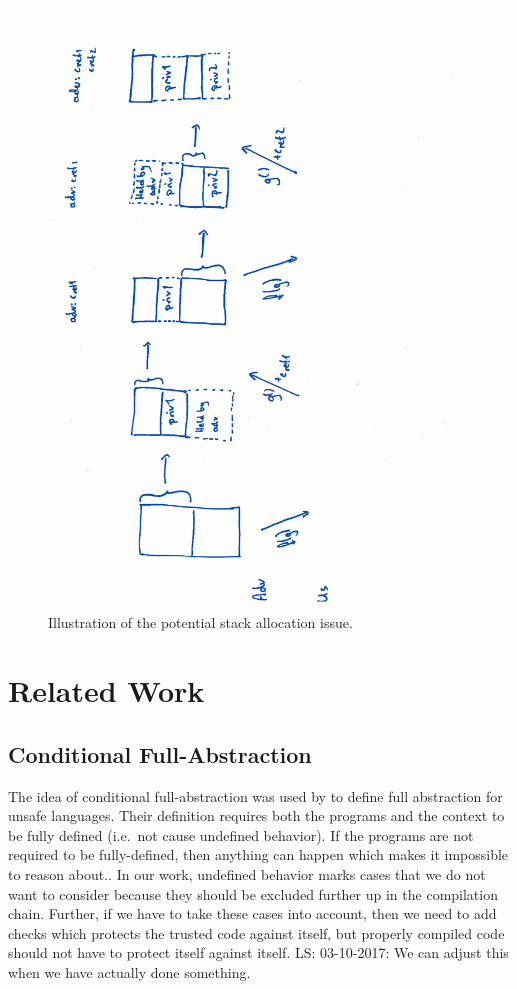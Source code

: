 \documentclass[a3paper]{article}
\newcommand\lau[1]{{\color{purple} \sf \footnotesize {LS: #1}}\\}
\begin{document}
\begin{figure}
  \centering
  \includegraphics[angle=270,trim={0 0 5cm 0},width=\textwidth]{img/stk-alloc.pdf}
  \caption{Illustration of the potential stack allocation issue.}
  \label{fig:stk-alloc}
\end{figure}

\section{Related Work}
\subsection{Conditional Full-Abstraction}
The idea of conditional full-abstraction was used by \citet{Juglaret2016} to define full abstraction for unsafe languages. Their definition requires both the programs and the context to be fully defined (i.e.\ not cause undefined behavior). If the programs are not required to be fully-defined, then anything can happen which makes it impossible to reason about.. In our work, undefined behavior marks cases that we do not want to consider because they should be excluded further up in the compilation chain. Further, if we have to take these cases into account, then we need to add checks which protects the trusted code against itself, but properly compiled code should not have to protect itself against itself.
\lau{03-10-2017: We can adjust this when we have actually done something.}


\end{document}
